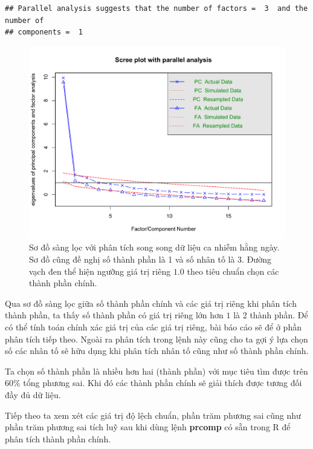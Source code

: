 \documentclass[../thesis.tex]{subfiles}
\begin{document}
\begin{verbatim}
## Parallel analysis suggests that the number of factors =  3  and the number of 
## components =  1
\end{verbatim}

\begin{figure}[H]
	\centering
	\includegraphics[width=1\linewidth]{images/scree_parall}
	\caption[Sơ đồ sàng lọc với phân tích song song dữ liệu ca nhiễm hằng ngày]{Sơ đồ sàng lọc với phân tích song song dữ liệu ca nhiễm hằng ngày. Sơ đồ cũng đề nghị số thành phần là 1 và số nhân tố là 3. Đường vạch đen thể hiện ngưỡng giá trị riêng $ 1.0 $ theo tiêu chuẩn chọn các thành phần chính. }
	\label{fig:screeparall}
\end{figure}

Qua sơ đồ sàng lọc giữa số thành phần chính và các giá trị riêng khi phân tích thành phần, ta thấy số thành phần có giá trị riêng lớn hơn $ 1 $ là 2 thành phần. Để có thể tính toán chính xác giá trị của các giá trị riêng, bài báo cáo sẽ để ở phần phân tích tiếp theo. Ngoài ra phân tích trong lệnh này cũng cho ta gợi ý lựa chọn số các nhân tố sẽ hữu dụng khi phân tích nhân tố cũng như số thành phần chính. 

Ta chọn số thành phần là nhiều hơn hai (thành phần) với mục tiêu tìm được trên $ 60\% $ tổng phương sai. Khi đó các thành phần chính sẽ giải thích được tương đối đầy đủ dữ liệu.

Tiếp theo ta xem xét các giá trị độ lệch chuẩn, phần trăm phương sai cũng như phần trăm phương sai tích luỹ sau khi dùng lệnh \textbf{prcomp} có sẵn trong R để phân tích thành phần chính.
\end{document}
